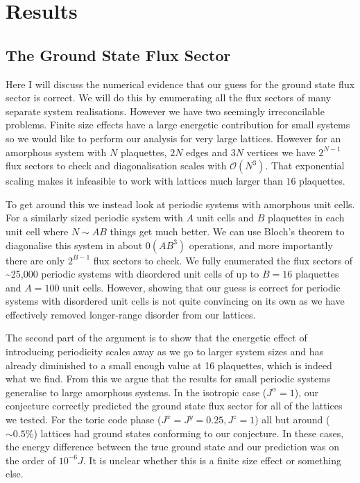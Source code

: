 \hypertarget{amk-results}{%
\section{Results}\label{amk-results}}

\hypertarget{the-ground-state-flux-sector}{%
\subsection{The Ground State Flux Sector}\label{the-ground-state-flux-sector}}

Here I will discuss the numerical evidence that our guess for the ground state flux sector is correct. We will do this by enumerating all the flux sectors of many separate system realisations. However we have two seemingly irreconcilable problems. Finite size effects have a large energetic contribution for small systems~\autocite{kitaevAnyonsExactlySolved2006} so we would like to perform our analysis for very large lattices. However for an amorphous system with \(N\) plaquettes, \(2N\) edges and \(3N\) vertices we have \(2^{N-1}\) flux sectors to check and diagonalisation scales with \(\mathcal{O}(N^3)\). That exponential scaling makes it infeasible to work with lattices much larger than \(16\) plaquettes.

To get around this we instead look at periodic systems with amorphous unit cells. For a similarly sized periodic system with \(A\) unit cells and \(B\) plaquettes in each unit cell where \(N \sim AB\) things get much better. We can use Bloch's theorem to diagonalise this system in about \(\mathcal{0}(A B^3)\) operations, and more importantly there are only \(2^{B-1}\) flux sectors to check. We fully enumerated the flux sectors of \textasciitilde25,000 periodic systems with disordered unit cells of up to \(B = 16\) plaquettes and \(A = 100\) unit cells. However, showing that our guess is correct for periodic systems with disordered unit cells is not quite convincing on its own as we have effectively removed longer-range disorder from our lattices.

The second part of the argument is to show that the energetic effect of introducing periodicity scales away as we go to larger system sizes and has already diminished to a small enough value at 16 plaquettes, which is indeed what we find. From this we argue that the results for small periodic systems generalise to large amorphous systems. In the isotropic case (\(J^\alpha = 1\)), our conjecture correctly predicted the ground state flux sector for all of the lattices we tested. For the toric code phase (\(J^x = J^y = 0.25, J^z = 1\)) all but around (\(\sim 0.5 \%\)) lattices had ground states conforming to our conjecture. In these cases, the energy difference between the true ground state and our prediction was on the order of \(10^{-6} J\). It is unclear whether this is a finite size effect or something else.

